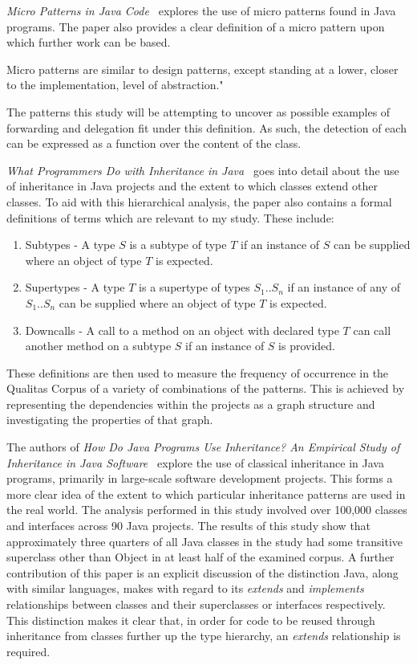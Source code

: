 \textit{Micro Patterns in Java Code~\cite{JavaMicropatterns}} explores the use of micro patterns found in Java programs. The paper also provides a clear definition of a micro pattern upon which further work can be based.
\begin{displayquote}
	Micro patterns are similar to design patterns, except standing at a lower, closer to the implementation, level of abstraction."~\cite{JavaMicropatterns}
\end{displayquote}
The patterns this study will be attempting to uncover as possible examples of forwarding and delegation fit under this definition. As such, the detection of each can be expressed as a function over the content of the class.
\newline

\textit{What Programmers Do with Inheritance in Java~\cite{InheritanceInJava}} goes into detail about the use of inheritance in Java projects and the extent to which classes extend other classes. To aid with this hierarchical analysis, the paper also contains a formal definitions of terms which are relevant to my study. These include:
\begin{enumerate}
	\item Subtypes - A type $S$ is a subtype of type $T$ if an instance of $S$ can be supplied where an object of type $T$ is expected.
	\item Supertypes - A type $T$ is a supertype of types $S_1..S_n$ if an instance of any of $S_1..S_n$ can be supplied where an object of type $T$ is expected.
	\item Downcalls - A call to a method on an object with declared type $T$ can call another method on a subtype $S$ if an instance of $S$ is provided.
\end{enumerate}
These definitions are then used to measure the frequency of occurrence in the Qualitas Corpus of a variety of combinations of the patterns. This is achieved by representing the dependencies within the projects as a graph structure and investigating the properties of that graph.
\newline

The authors of \textit{How Do Java Programs Use Inheritance? An Empirical Study of Inheritance in Java Software~\cite{HowProgramsUseInheritance}} explore the use of classical inheritance in Java programs, primarily in large-scale software development projects. This forms a more clear idea of the extent to which particular inheritance patterns are used in the real world. The analysis performed in this study involved over 100,000 classes and interfaces across 90 Java projects. The results of this study show that approximately three quarters of all Java classes in the study had some transitive superclass other than Object in at least half of the examined corpus. \newline
A further contribution of this paper is an explicit discussion of the distinction Java, along with similar languages, makes with regard to its \textit{extends} and \textit{implements} relationships between classes and their superclasses or interfaces respectively. This distinction makes it clear that, in order for code to be reused through inheritance from classes further up the type hierarchy, an \textit{extends} relationship is required.

